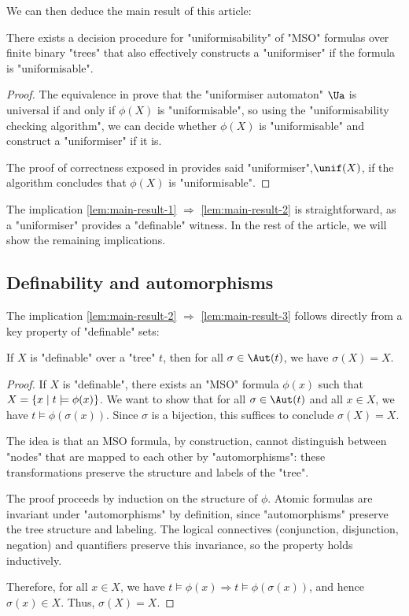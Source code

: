 \documentclass[a4paper,UKenglish,cleveref, autoref, thm-restate]{lipics-v2021}
\begin{document}
We can then deduce the main result of this article:
\begin{theorem} \label{thm:uniformisability-decision}
	There exists a decision procedure for "uniformisability" of "MSO" formulas over finite binary "trees" that
	also effectively constructs a "uniformiser" if the formula is "uniformisable".
\end{theorem}

\begin{proof}
	The equivalence in  prove that the "uniformiser automaton" $\Ua$ is universal if and only if $\phi(X)$ is "uniformisable", so using the
	"uniformisability checking algorithm", we can decide whether $\phi(X)$ is "uniformisable" and construct a "uniformiser" if it is.

	The proof of correctness exposed in  provides said "uniformiser",$\unif(X)$, if the algorithm concludes that $\phi(X)$ is "uniformisable".
\end{proof}


The implication \ref{lem:main-result-1} $\Rightarrow$ \ref{lem:main-result-2} is straightforward, as a "uniformiser" provides a "definable" witness.
In the rest of the article, we will show the remaining implications.

\subsection{Definability and automorphisms}

The implication \ref{lem:main-result-2} $\Rightarrow$ \ref{lem:main-result-3} follows directly from a key property of "definable" sets:

\begin{lemma}\label{lem:def-aut}
	If $X$ is "definable" over a "tree" $t$, then for all $\sigma \in \Aut(t)$, we have $\sigma(X) = X$.
\end{lemma}

\begin{proof}
	If $X$ is "definable", there exists an "MSO" formula $\phi(x)$ such that $X = \left\{x \mid t \models \phi(x)\right\}$.
	We want to show that for all $\sigma \in \Aut(t)$ and all $x \in X$, we have $t \models \phi(\sigma(x))$.
	Since $\sigma$ is a bijection, this suffices to conclude $\sigma(X) = X$.

	The idea is that an MSO formula, by construction, cannot distinguish between "nodes" that are mapped to each other by "automorphisms":
	these transformations preserve the structure and labels of the "tree".

	The proof proceeds by induction on the structure of $\phi$. Atomic formulas are invariant under "automorphisms" by definition,
	since "automorphisms" preserve the tree structure and labeling. The logical connectives (conjunction, disjunction, negation)
	and quantifiers preserve this invariance, so the property holds inductively.

	Therefore, for all $x \in X$, we have $t \models \phi(x) \Rightarrow t \models \phi(\sigma(x))$, and hence $\sigma(x) \in X$. Thus, $\sigma(X) = X$.
\end{proof}
\end{document}
